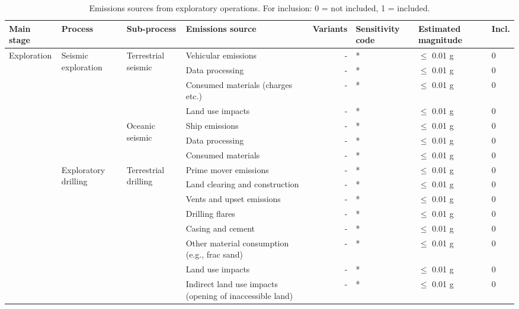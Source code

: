 \documentclass[11pt]{report}
\begin{document}
\begin{landscape}
\begin{table}
\begin{scriptsize}
\caption{Emissions sources from exploratory operations. For inclusion: 0 = not included, 1 = included.}
\label{tab:exploration_sources}
\begin{tabular}{|p{}|p{}|p{}|p{}|r|p{}|p{}|p{}|}
\hline
\textbf{Main stage} & \textbf{Process} & \textbf{Sub-process} & \textbf{Emissions source} & \textbf{Variants}& \textbf{Sensitivity code} & \textbf{Estimated magnitude} & \textbf{Incl.}\\
\hline
\multirow{25}{0.08\columnwidth}{Exploration} & \multirow{7}{0.09\columnwidth}{Seismic exploration} & \multirow{4}{0.09\columnwidth}{Terrestrial seismic} & Vehicular emissions & - & * & $\leq$ 0.01 g & 0\\
\cline{4-8}
& & & Data processing & - & * & $\leq$ 0.01 g & 0\\
\cline{4-8}
& & & Consumed materials (charges etc.) & - & * & $\leq$ 0.01 g & 0\\
\cline{4-8}
& & & Land use impacts & - & * & $\leq$ 0.01 g & 0\\
\cline{3-8}
& & \multirow{3}{*}{Oceanic seismic} & Ship emissions & - & * & $\leq$ 0.01 g & 0\\
\cline{4-8}
& & & Data processing & - & * & $\leq$ 0.01 g & 0\\
\cline{4-8}
& & & Consumed materials & - & * & $\leq$ 0.01 g & 0\\
\cline{2-8}
& \multirow{12}{0.09\columnwidth}{Exploratory drilling} & \multirow{8}{0.09\columnwidth}{Terrestrial drilling} & Prime mover emissions & - & * & $\leq$ 0.01 g & 0\\
\cline{4-8}
& & & Land clearing and construction & - & * & $\leq$ 0.01 g & 0\\
\cline{4-8}
& & & Vents and upset emissions & - & * & $\leq$ 0.01 g & 0\\
\cline{4-8}
& & & Drilling flares & - & * & $\leq$ 0.01 g & 0\\
\cline{4-8}
& & & Casing and cement & - & * & $\leq$ 0.01 g & 0\\
\cline{4-8}
& & & Other material consumption (e.g., frac sand) & - & * & $\leq$ 0.01 g & 0\\
\cline{4-8}
& & & Land use impacts & - & * & $\leq$ 0.01 g & 0\\
\cline{4-8}
& & & Indirect land use impacts (opening of inaccessible land) & - & * & $\leq$ 0.01 g & 0\\

\end{tabular}
\end{scriptsize}
\end{table}
\end{landscape}
\end{document}
